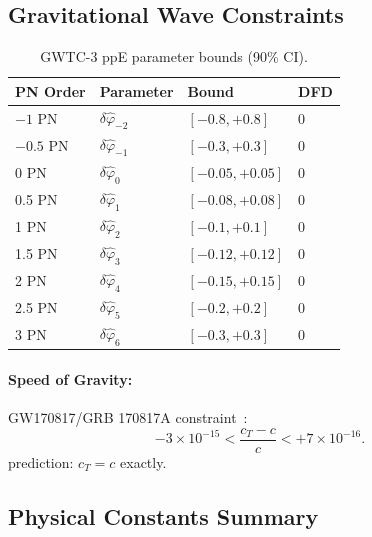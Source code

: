 \subsection{Gravitational Wave Constraints}\label{app:gw_data}

\begin{table}[h!]
\centering
\caption{GWTC-3 ppE parameter bounds (90\% CI).}
\label{tab:ppe_bounds}
\begin{tabular}{llll}
\toprule
\textbf{PN Order} & \textbf{Parameter} & \textbf{Bound} & \textbf{DFD} \\
\midrule
$-1$ PN & $\delta\hat{\varphi}_{-2}$ & $[-0.8, +0.8]$ & 0 \\
$-0.5$ PN & $\delta\hat{\varphi}_{-1}$ & $[-0.3, +0.3]$ & 0 \\
0 PN & $\delta\hat{\varphi}_0$ & $[-0.05, +0.05]$ & 0 \\
0.5 PN & $\delta\hat{\varphi}_1$ & $[-0.08, +0.08]$ & 0 \\
1 PN & $\delta\hat{\varphi}_2$ & $[-0.1, +0.1]$ & 0 \\
1.5 PN & $\delta\hat{\varphi}_3$ & $[-0.12, +0.12]$ & 0 \\
2 PN & $\delta\hat{\varphi}_4$ & $[-0.15, +0.15]$ & 0 \\
2.5 PN & $\delta\hat{\varphi}_5$ & $[-0.2, +0.2]$ & 0 \\
3 PN & $\delta\hat{\varphi}_6$ & $[-0.3, +0.3]$ & 0 \\
\bottomrule
\end{tabular}
\end{table}

\paragraph{Speed of Gravity:}
GW170817/GRB 170817A constraint~\cite{Abbott2017}:
\begin{equation}
-3 \times 10^{-15} < \frac{c_T - c}{c} < +7 \times 10^{-16}.
\end{equation}
\DFD prediction: $c_T = c$ exactly.

\subsection{Physical Constants Summary}\label{app:constants_summary}

